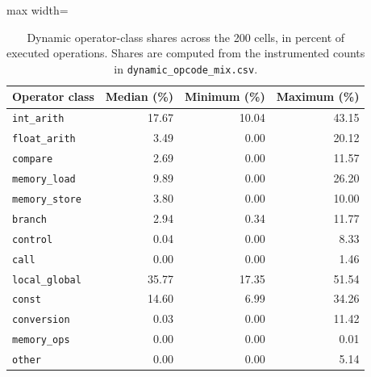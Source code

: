 \begin{table}[t]
\caption{Dynamic operator-class shares across the 200 cells, in percent of executed operations. Shares are computed from the instrumented counts in \texttt{dynamic\_opcode\_mix.csv}.}\label{tab:opcode_shares}
\footnotesize
\setlength{\tabcolsep}{6pt}%
\begin{adjustbox}{max width=\textwidth}%
\begin{tabular}{lrrr}
\toprule
Operator class & Median (\%) & Minimum (\%) & Maximum (\%) \\
\midrule
\texttt{int\_arith} & 17.67 & 10.04 & 43.15 \\
\texttt{float\_arith} & 3.49 & 0.00 & 20.12 \\
\texttt{compare} & 2.69 & 0.00 & 11.57 \\
\texttt{memory\_load} & 9.89 & 0.00 & 26.20 \\
\texttt{memory\_store} & 3.80 & 0.00 & 10.00 \\
\texttt{branch} & 2.94 & 0.34 & 11.77 \\
\texttt{control} & 0.04 & 0.00 & 8.33 \\
\texttt{call} & 0.00 & 0.00 & 1.46 \\
\texttt{local\_global} & 35.77 & 17.35 & 51.54 \\
\texttt{const} & 14.60 & 6.99 & 34.26 \\
\texttt{conversion} & 0.03 & 0.00 & 11.42 \\
\texttt{memory\_ops} & 0.00 & 0.00 & 0.01 \\
\texttt{other} & 0.00 & 0.00 & 5.14 \\
\bottomrule
\end{tabular}%
\end{adjustbox}
\end{table}
